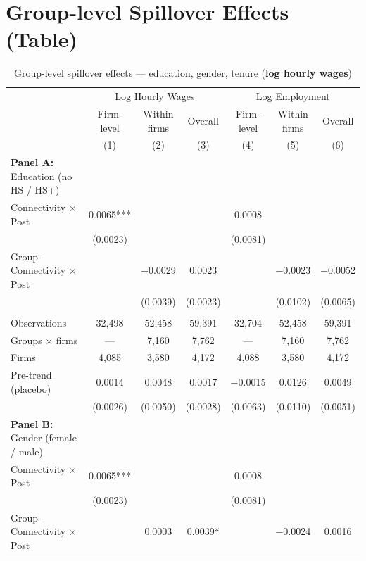 \documentclass[11pt]{article}
\begin{document}
\section{Group-level Spillover Effects (Table)}
\begin{table}[H]
\centering
\caption{Group-level spillover effects --- education, gender, tenure (\textbf{log hourly wages})}
\scriptsize
\begin{tabular}{lcccccc}
\toprule\toprule
 & \multicolumn{3}{c}{Log Hourly Wages} & \multicolumn{3}{c}{Log Employment} \\
\cmidrule(lr){2-4} \cmidrule(lr){5-7}
 & \shortstack{Firm-\\level} & \shortstack{Within\\firms} & Overall
 & \shortstack{Firm-\\level} & \shortstack{Within\\firms} & Overall \\
 & (1) & (2) & (3) & (4) & (5) & (6) \\
\midrule
\textbf{Panel A:} Education (no HS / HS+) &  &  &  &  &  &  \\
Connectivity $\times$ Post & 0.0065*** &  &  & 0.0008 &  &  \\
 & (0.0023) &  &  & (0.0081) &  &  \\
Group-Connectivity $\times$ Post &  & $-$0.0029 & 0.0023 &  & $-$0.0023 & $-$0.0052 \\
 &  & (0.0039) & (0.0023) &  & (0.0102) & (0.0065) \\
 &  &  &  &  &  &  \\
Observations & 32{,}498 & 52{,}458 & 59{,}391 & 32{,}704 & 52{,}458 & 59{,}391 \\
Groups $\times$ firms & --- & 7{,}160 & 7{,}762 & --- & 7{,}160 & 7{,}762 \\
Firms & 4{,}085 & 3{,}580 & 4{,}172 & 4{,}088 & 3{,}580 & 4{,}172 \\
Pre-trend (placebo) & 0.0014 & 0.0048 & 0.0017 & $-$0.0015 & 0.0126 & 0.0049 \\
 & (0.0026) & (0.0050) & (0.0028) & (0.0063) & (0.0110) & (0.0051) \\
\midrule
\textbf{Panel B:} Gender (female / male) &  &  &  &  &  &  \\
Connectivity $\times$ Post & 0.0065*** &  &  & 0.0008 &  &  \\
 & (0.0023) &  &  & (0.0081) &  &  \\
Group-Connectivity $\times$ Post &  & 0.0003 & 0.0039* &  & $-$0.0024 & 0.0016 \\

\end{tabular}
\end{table}
\end{document}
